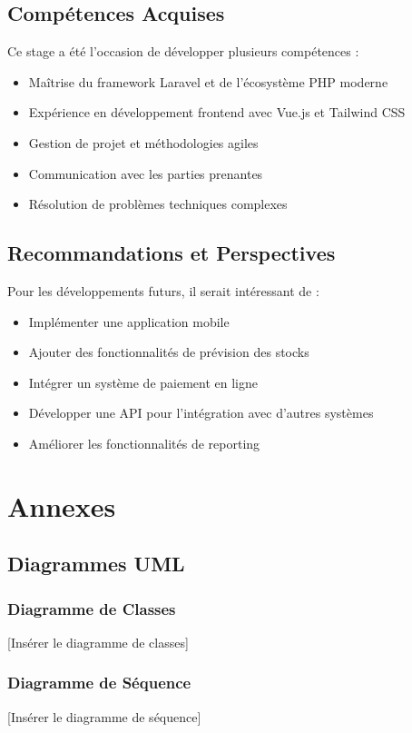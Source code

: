 \documentclass{report}
\begin{document}
\section{Compétences Acquises}
Ce stage a été l'occasion de développer plusieurs compétences :
\begin{itemize}
    \item Maîtrise du framework Laravel et de l'écosystème PHP moderne
    \item Expérience en développement frontend avec Vue.js et Tailwind CSS
    \item Gestion de projet et méthodologies agiles
    \item Communication avec les parties prenantes
    \item Résolution de problèmes techniques complexes
\end{itemize}

\section{Recommandations et Perspectives}
Pour les développements futurs, il serait intéressant de :
\begin{itemize}
    \item Implémenter une application mobile
    \item Ajouter des fonctionnalités de prévision des stocks
    \item Intégrer un système de paiement en ligne
    \item Développer une API pour l'intégration avec d'autres systèmes
    \item Améliorer les fonctionnalités de reporting
\end{itemize}

\appendix
\chapter{Annexes}

\section{Diagrammes UML}
\subsection{Diagramme de Classes}
[Insérer le diagramme de classes]

\subsection{Diagramme de Séquence}
[Insérer le diagramme de séquence]
\end{document}
